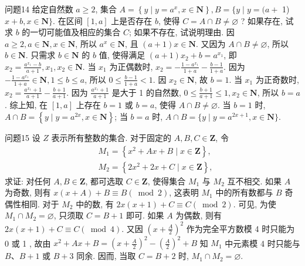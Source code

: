 问题14 给定自然数 $a \geqslant 2$, 集合 $A=\left\{y \mid y=a^x, x \in \mathbf{N}\right\}, B=\{y \mid y=(a+$ 1) $x+b, x \in \mathbf{N}\}$. 在区间 $[1, a]$ 上是否存在 $b$, 使得 $C=A \cap B \neq \varnothing$ ? 如果存在, 试求 $b$ 的一切可能值及相应的集合 $C$; 如果不存在, 试说明理由.
因 $a \geqslant 2, a \in \mathbf{N}, x \in \mathbf{N}$, 所以 $a^x \in \mathbf{N}$, 且 $(a+1) x \in \mathbf{N}$. 又因为 $A \cap B \neq \varnothing$, 所以 $b \in \mathbf{N}$. 只需求 $b \in \mathbf{N}$ 的 $b$ 值, 使得满足 $(a+1) x_2+b=a^{x_1}$, 即 $x_2=\frac{a^{x_1}-b}{a+1}, x_1, x_2 \in \mathbf{N}$. 当 $x_1$ 为正偶数时, $x_2=-\frac{1-a^{x_1}}{1+a}-\frac{b-1}{1+a}$. 因为 $-\frac{1-a^{x_1}}{1+a} \in \mathbf{N}, 1 \leqslant b \leqslant a$, 所以 $0 \leqslant \frac{b-1}{1+a}<1$. 因 $x_2 \in \mathbf{N}$, 故 $b=1$. 当 $x_1$ 为正奇数时, $x_2=\frac{a^{x_1}+1}{a+1}-\frac{b+1}{a+1}$. 因为 $\frac{a^{x_1}+1}{a+1}$ 是大于 1 的自然数, $0 \leqslant \frac{b+1}{a+1} \leqslant 1, x_2 \in \mathbf{N}$, 所以 $b=a$. 综上知, 在 $[1, a]$ 上存在 $b=1$ 或 $b=a$, 使得 $A \cap B \neq \varnothing$. 当 $b=1$ 时, $A \cap B=\left\{y \mid y=a^{2 x}, x \in \mathbf{N}\right\}$; 当 $b=a$ 时, $A \cap B=\{y \mid y=a^{2 x+1}, x \in \mathbf{N}\}$.



问题15 设 $Z$ 表示所有整数的集合.
对于固定的 $A, B, C \in \mathbf{Z}$, 令
$$
\begin{aligned}
& M_1=\left\{x^2+A x+B \mid x \in \mathbf{Z}\right\}, \\
& M_2=\left\{2 x^2+2 x+C \mid x \in \mathbf{Z}\right\},
\end{aligned}
$$
求证: 对任何 $A, B \in \mathbf{Z}$, 都可选取 $C \in \mathbf{Z}$, 使得集合 $M_1$ 与 $M_2$ 互不相交.
如果 $A$ 为奇数, 则有 $x(x+A)+B \equiv B(\bmod 2)$, 这表明 $M_1$ 中的所有数都与 $B$ 奇偶性相同.
对于 $M_2$ 中的数, 有 $2 x(x+1)+C \equiv C(\bmod 2)$. 可见, 为使 $M_1 \cap M_2=\varnothing$, 只须取 $C=B+1$ 即可.
如果 $A$ 为偶数, 则有 $2 x(x+1)+C \equiv C(\bmod 4)$. 又因 $\left(x+\frac{A}{2}\right)^2$ 作为完全平方数模 4 时只能为 0 或 1 , 故由 $x^2+A x+B=\left(x+\frac{A}{2}\right)^2-\left(\frac{A}{2}\right)^2+B$ 知 $M_1$ 中元素模 4 时只能与 $B 、 B+1$ 或 $B+3$ 同余.
因而, 当取 $C=B+2$ 时, $M_1 \cap M_2=\varnothing$.



